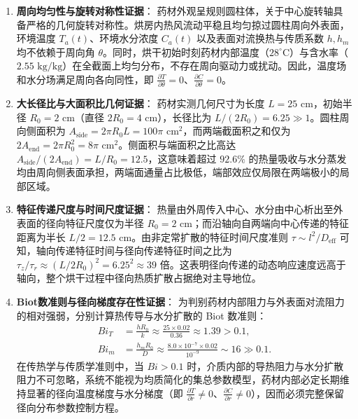 \documentclass[12pt,a4paper]{ctexart}
\begin{document}
\begin{enumerate}[label=(\arabic*)]
  \item \textbf{周向均匀性与旋转对称性证据}：
  药材外观呈规则圆柱体，关于中心旋转轴具备严格的几何旋转对称性。烘房内热风流动平稳且均匀掠过圆柱周向外表面，环境温度 $T_a(t)$、环境水分浓度 $C_a(t)$ 以及表面对流换热与传质系数 $h, h_m$ 均不依赖于周向角 $\theta$。同时，烘干初始时刻药材内部温度（$28^\circ\text{C}$）与含水率（$2.55\text{ kg/kg}$）在全截面上均匀分布，不存在周向驱动力或扰动。因此，温度场和水分场满足周向各向同性，即 $\frac{\partial T}{\partial\theta}=0$、$\frac{\partial C}{\partial\theta}=0$。

  \item \textbf{大长径比与大面积比几何证据}：
  药材实测几何尺寸为长度 $L=25\text{ cm}$，初始半径 $R_0=2\text{ cm}$（直径 $2R_0=4\text{ cm}$），长径比为 $L/(2R_0)=6.25\gg1$。圆柱周向侧面积为 $A_{\text{side}}=2\pi R_0 L=100\pi\text{ cm}^2$，而两端截面积之和仅为 $2A_{\text{end}}=2\pi R_0^2=8\pi\text{ cm}^2$。侧面积与端面积之比高达 $A_{\text{side}}/(2A_{\text{end}})=L/R_0=12.5$，这意味着超过 $92.6\%$ 的热量吸收与水分蒸发均由周向侧表面承担，两端面通量占比极低，端部效应仅局限在两端极小的局部区域。

  \item \textbf{特征传递尺度与时间尺度证据}：
  热量由外周传入中心、水分由中心析出至外表面的径向特征尺度仅为半径 $R_0=2\text{ cm}$；而沿轴向自两端向中心传递的特征距离为半长 $L/2=12.5\text{ cm}$。由非定常扩散的特征时间尺度准则 $\tau \sim l^2/D_{\text{eff}}$ 可知，轴向传递特征时间与径向传递特征时间之比为 $\tau_z/\tau_r \approx (L/2R_0)^2 = 6.25^2 \approx 39$ 倍。这表明径向传递的动态响应速度远高于轴向，整个烘干过程中径向热质扩散占据绝对主导地位。

  \item \textbf{Biot数准则与径向梯度存在性证据}：
  为判别药材内部阻力与外表面对流阻力的相对强弱，分别计算热传导与水分扩散的 Biot 数准则：
  \begin{align}
  Bi_T &= \frac{h R_0}{k} \approx \frac{25 \times 0.02}{0.36} \approx 1.39 > 0.1,\label{eq:biot_t}\\
  Bi_m &= \frac{h_m R_0}{D} \approx \frac{8.0\times 10^{-7} \times 0.02}{10^{-9}} \sim 16 \gg 0.1.\label{eq:biot_m}
  \end{align}
  在传热学与传质学准则中，当 $Bi > 0.1$ 时，介质内部的导热阻力与水分扩散阻力不可忽略，系统不能视为均质简化的集总参数模型，药材内部必定长期维持显著的径向温度梯度与水分梯度（即 $\frac{\partial T}{\partial r}\neq0$、$\frac{\partial C}{\partial r}\neq0$），因而必须完整保留径向分布参数控制方程。
\end{enumerate}
\end{document}
